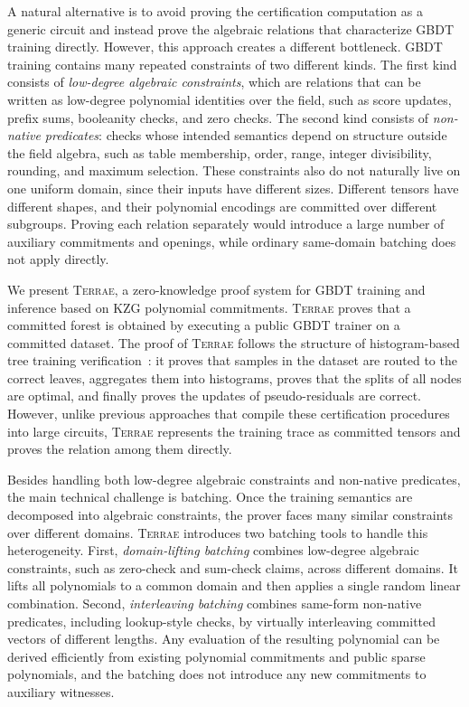 A natural alternative is to avoid proving the certification computation as a
generic circuit and instead prove the algebraic relations that characterize
GBDT training directly. However, this approach creates a different bottleneck.
GBDT training contains many repeated constraints of two different kinds. The
first kind consists of \emph{low-degree algebraic constraints}, which are relations that
can be written as low-degree polynomial identities over the field, such as
score updates, prefix sums, booleanity checks, and
zero checks. The second kind consists of
\emph{non-native predicates}: checks whose intended semantics depend on
structure outside the field algebra, such as table membership, order, range,
integer divisibility, rounding, and maximum selection.
These constraints also do not naturally live on one uniform domain,
since their inputs have different sizes.
Different tensors have different shapes, and their polynomial encodings are
committed over different subgroups. Proving each relation separately would
introduce a large number of auxiliary commitments and openings, while ordinary
same-domain batching does not apply directly.

We present \textsc{Terrae}, a zero-knowledge proof system for GBDT
training and inference based on KZG polynomial commitments. \textsc{Terrae}
proves that a committed forest is obtained by executing a public GBDT
trainer on a committed dataset.
The proof of \textsc{Terrae}
follows the structure of histogram-based tree training verification~\cite{sparrow24,zkboost26}:
it proves that samples in the dataset
are routed to the correct leaves,
aggregates them into histograms,
proves that the splits of all nodes are optimal,
and finally proves the updates of pseudo-residuals are correct.
However, unlike previous approaches
that compile these certification procedures into
large circuits,
\textsc{Terrae} represents the training trace as
committed tensors and proves the relation among them directly.

Besides handling both low-degree algebraic constraints and non-native
predicates,
the main technical challenge is batching. Once the training semantics are
decomposed into algebraic constraints, the prover faces many similar constraints
over different domains. \textsc{Terrae} introduces two batching tools to handle
this heterogeneity. First, \emph{domain-lifting batching} combines low-degree
algebraic constraints, such as zero-check and sum-check claims, across
different domains. It
lifts all polynomials to a common domain and then applies a
single random linear combination. Second, \emph{interleaving batching} combines
same-form non-native predicates, including lookup-style checks, by virtually
interleaving committed vectors of different lengths. 
Any evaluation of the resulting polynomial can be derived efficiently from existing polynomial commitments and public sparse polynomials, 
and the batching does not introduce any new commitments to auxiliary witnesses.

